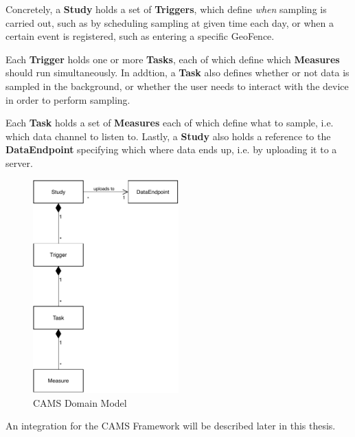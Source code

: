 Concretely, a \textbf{Study} holds a set of \textbf{Triggers}, which define \textit{when} sampling is carried out, such as by scheduling sampling at  given time each day, or when a certain event is registered, such as entering a specific GeoFence. 

Each \textbf{Trigger} holds one or more \textbf{Tasks}, each of which define which \textbf{Measures} should run simultaneously. In addtion, a \textbf{Task} also defines whether or not data is sampled in the background, or whether the user needs to interact with the device in order to perform sampling. 

Each \textbf{Task} holds a set of \textbf{Measures} each of which define what to sample, i.e. which data channel to listen to. Lastly, a \textbf{Study} also holds a reference to the \textbf{DataEndpoint} specifying which where data ends up, i.e. by uploading it to a server.

\begin{figure}
    \centering
    \includegraphics[width=0.5\textwidth]{images/CAMS.pdf}
    \caption{CAMS Domain Model}
    \label{fig:cams_uml}
\end{figure}

An integration for the CAMS Framework will be described later in this thesis. 